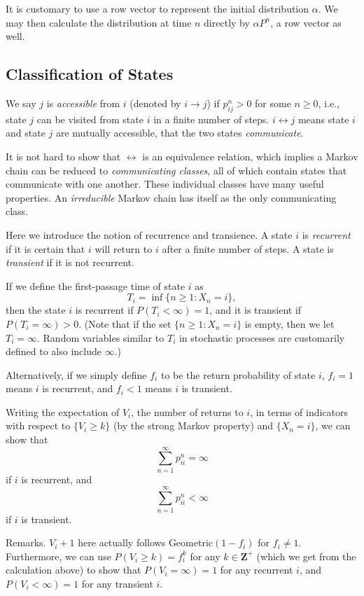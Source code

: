 \documentclass[11pt]{article}
\newcommand{\Z}{\mathbf{Z}}
\begin{document}
It is customary to use a row vector to represent the initial distribution $\alpha $. We may then calculate the distribution at time $n$ directly by $\alpha P^{n}$, a row vector as well.

\subsection{Classification of States}
We say $j$ is \textit{accessible} from $i$ (denoted by $i\rightarrow j$) if $p_{ij}^{n}>0$ for some $n\geq 0$, i.e., state $j$ can be visited from state $i$ in a finite number of steps. $i \leftrightarrow j$ means state $i$ and state $j$ are mutually accessible, that the two states \textit{communicate}.

It is not hard to show that $\leftrightarrow$ is an equivalence relation, which implies a Markov chain can be reduced to \textit{communicating classes}, all of which contain states that communicate with one another. These individual classes have many useful properties. An \textit{irreducible} Markov chain has itself as the only communicating class.

Here we introduce the notion of recurrence and transience. A state $i$ is \textit{recurrent} if it is certain that $i$ will return to $i$ after a finite number of steps. A state is \textit{transient} if it is not recurrent.

If we define the first-passage time of state $i$ as
\[
T_{i}=\inf \{n\geq 1:X_{n}=i\},
\]
then the state $i$ is recurrent if $P(T_{i}<\infty )=1$, and it is transient if $P(T_{i}=\infty )>0$. (Note that if the set $\{n\geq 1:X_{n}=i\}$ is empty, then we let $T_{i}=\infty $. Random variables similar to $T_{i}$ in stochastic processes are customarily defined to also include $\infty $.)

Alternatively, if we simply define $f_{i}$ to be the return probability of state $i$, $f_{i}=1$ means $i$ is recurrent, and $f_{i}<1$ means $i$ is transient.

Writing the expectation of $V_{i}$, the number of returns to $i$, in terms of indicators with respect to $\{V_{i}\geq k\}$ (by the strong Markov property) and $\{X_{n}=i\}$, we can show that
\[
\sum_{n=1}^{\infty }p_{ii}^{n}=\infty 
\]
if $i$ is recurrent, and
\[
\sum_{n=1}^{\infty }p_{ii}^{n}<\infty 
\]
if $i$ is transient.

\noindent Remarks. $V_{i}+1$ here actually follows Geometric$(1- f_{i})$ for $f_{i}\neq 1$. Furthermore, we can use $P(V_{i}\geq k)=f_{i}^{k}$ for any $k\in \Z^+$ (which we get from the calculation above) to show that $P(V_{i}=\infty )=1$ for any recurrent $i$, and $P(V_{i}<\infty )=1$ for any transient $i$.
\end{document}
